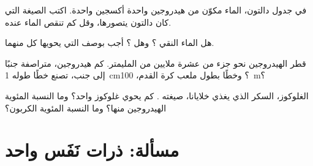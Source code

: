\begin{exercise}[$\star\star$]\label{exo:g7:atoms-and-molecules:9}
في جدول دالتون، الماء مكوّن من  هيدروجين واحدة  أكسجين واحدة.
اكتب الصيغة التي كان دالتون يتصورها، وقل كم  تنقص  الماء
عنده.
\end{exercise}

\begin{exercise}[$\star\star$]\label{exo:g7:atoms-and-molecules:10}
هل الماء النقي ؟ وهل  ؟ أجب بوصف  التي يحويها
كل منهما.
\end{exercise}

\begin{exercise}[$\star\star\star$]\label{exo:g7:atoms-and-molecules:11}
قطر  الهيدروجين نحو جزء من عشرة ملايين من المليمتر. كم  هيدروجين،
متراصفة جنبًا إلى جنب، تصنع خطًا طوله \qty{1}{cm}؟ وخطًا بطول ملعب كرة
القدم، \qty{100}{m}؟
\end{exercise}

\begin{exercise}[$\star\star\star$]\label{exo:g7:atoms-and-molecules:12}
الغلوكوز، السكر الذي يغذي خلايانا، صيغته
. كم  يحوي  غلوكوز واحد؟ وما النسبة المئوية 
الهيدروجين منها؟ وما النسبة المئوية  الكربون؟
\end{exercise}

\section{مسألة: ذرات نَفَس واحد}


